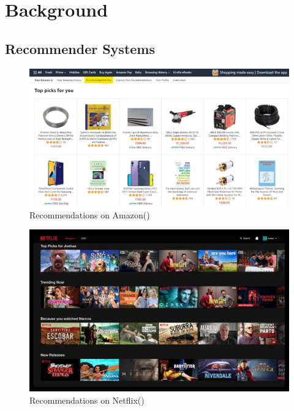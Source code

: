 \documentclass{l4proj}
\begin{document}
\chapter{Background}
\section{Recommender Systems}
\begin{figure}
    \centering
    \includegraphics[width=1\linewidth]{images/amazonrecs.png}
    \caption{Recommendations on Amazon(\cite{Muralidharan_2023})}
    \label{fig:amazon}
\end{figure}
\begin{figure}
    \centering
    \includegraphics[width=1\linewidth]{images/netflixrecs.png}
    \caption{Recommendations on Netflix(\cite{Krysik_2021})}
    \label{fig:netflix}
\end{figure}
\end{document}
